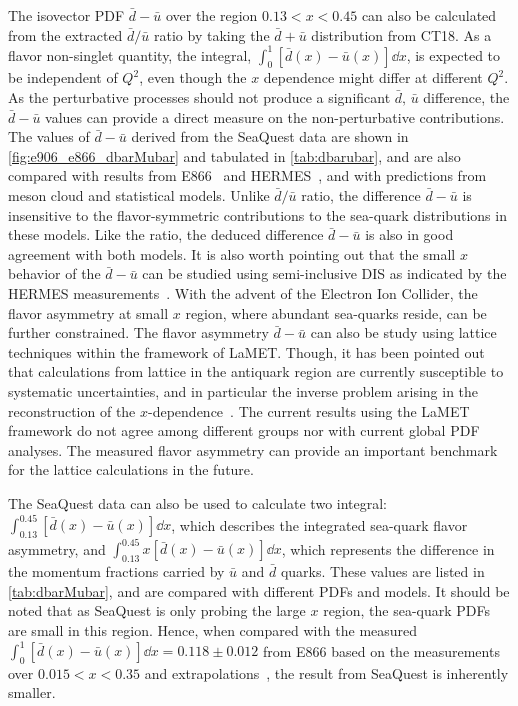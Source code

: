 \documentclass[reprint,aps,unsortedaddress,superscriptaddress,prc,floatfix,showpacs,linenumbers,final]{revtex4-2}
\begin{document}
The isovector PDF $\bar{d}-\bar{u}$ over the region $0.13<x<0.45$
can also be calculated from the extracted $\bar{d}/\bar{u}$ ratio by taking the $\bar{d}+\bar{u}$
distribution from CT18.
As a flavor non-singlet quantity, the integral, $\int^1_0 \left[\bar{d}\left(x\right) - \bar{u}\left(x\right)\right] \dd{x}$,
is expected to be independent of $Q^2$, even though the $x$ dependence might differ at different $Q^2$.
As the perturbative processes should not produce a significant $\bar{d},\,\bar{u}$ difference,
the $\bar{d}-\bar{u}$ values can provide a direct measure on the non-perturbative contributions.
The values of $\bar{d}-\bar{u}$ derived from the SeaQuest data are shown in \cref{fig:e906_e866_dbarMubar} and tabulated in \cref{tab:dbarubar},
and are also compared with results from E866~\cite{towell2001} and HERMES~\cite{ackerstaff1998},
and with predictions from meson cloud and statistical models.
Unlike $\bar{d}/\bar{u}$ ratio, the difference $\bar{d}-\bar{u}$ is insensitive to the flavor-symmetric contributions
to the sea-quark distributions in these models. Like the ratio, the deduced difference $\bar{d}-\bar{u}$ is also
in good agreement with both models.
It is also worth pointing out that the small $x$ behavior of the $\bar{d}-\bar{u}$ can be studied using
semi-inclusive DIS as indicated by the HERMES measurements~\cite{ackerstaff1998}.
With the advent of the Electron Ion Collider, the flavor asymmetry at small $x$ region, where abundant sea-quarks reside,
can be further constrained.
The flavor asymmetry $\bar{d}-\bar{u}$ can also be study using lattice techniques
within the framework of LaMET.
Though, it has been pointed out that calculations from lattice in the antiquark region are currently
susceptible to systematic uncertainties,
and in particular the inverse problem arising in the reconstruction of the $x$-dependence~\cite{constantinou2021}.
The current results using the LaMET framework do not agree among different groups nor with current global PDF analyses.
The measured flavor asymmetry can provide an important benchmark for the lattice calculations in the future.

The SeaQuest data can also be used to calculate two integral: $\int^{0.45}_{0.13} \left[\bar{d}\left(x\right) - \bar{u}\left(x\right) \right]\dd{x}$,
which describes the integrated sea-quark flavor asymmetry, and $\int^{0.45}_{0.13} x\left[\bar{d}\left(x\right) - \bar{u}\left(x\right) \right]\dd{x}$,
which represents the difference in the momentum fractions carried by $\bar{u}$ and $\bar{d}$ quarks.
These values are listed in \cref{tab:dbarMubar}, and are compared with different PDFs and models.
It should be noted that as SeaQuest is only probing the large $x$ region, the sea-quark PDFs are small in this region.
Hence, when compared with the measured $\int^{1}_{0} \left[\bar{d}\left(x\right) - \bar{u}\left(x\right) \right]\dd{x}=0.118\pm 0.012$
from E866 based on the measurements over $0.015<x<0.35$ and extrapolations~\cite{towell2001},
the result from SeaQuest is inherently smaller.
\end{document}

